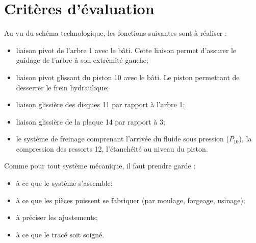\documentclass[11pt,oneside]{article}
\begin{document}
\section*{Critères d'évaluation}

Au vu du schéma technologique, les fonctions suivantes sont à réaliser :
\begin{itemize}
\item liaison pivot de l'arbre 1 avec le bâti. Cette liaison permet d'assurer le guidage de l'arbre à son extrémité gauche;
\item liaison pivot glissant du piston 10 avec le bâti. Le piston permettant de desserrer le frein hydraulique;
\item liaison glissière des disques 11 par rapport à l'arbre 1;
\item liaison glissière de la plaque 14 par rapport à 3;
\item le système de freinage comprenant l'arrivée du fluide sous pression ($P_{10}$), la compression des ressorts 12, l'étanchéité au niveau du piston.
\end{itemize}

Comme pour tout système mécanique, il faut prendre garde : 
\begin{itemize}
\item à ce que le système s'assemble;
\item à ce que les pièces puissent se fabriquer (par moulage, forgeage, usinage);
\item à préciser les ajustements;
\item à ce que le tracé soit soigné.
\end{itemize}
\end{document}
